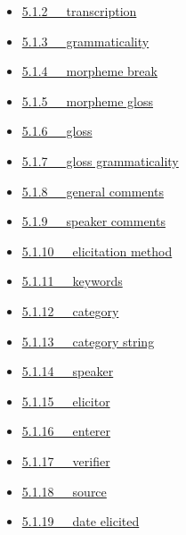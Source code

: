 \documentclass[letterpaper,10pt,english]{sphinxmanual}
\begin{document}
{\begin{minipage}{0.95\linewidth}
\begin{itemize}
\begin{itemize}
\begin{itemize}
\item {} 
{\hyperref[documentation:transcription]{5.1.2   transcription}}

\item {} 
{\hyperref[documentation:grammaticality]{5.1.3   grammaticality}}

\item {} 
{\hyperref[documentation:morpheme-break]{5.1.4   morpheme break}}

\item {} 
{\hyperref[documentation:morpheme-gloss]{5.1.5   morpheme gloss}}

\item {} 
{\hyperref[documentation:gloss]{5.1.6   gloss}}

\item {} 
{\hyperref[documentation:gloss-grammaticality]{5.1.7   gloss grammaticality}}

\item {} 
{\hyperref[documentation:general-comments]{5.1.8   general comments}}

\item {} 
{\hyperref[documentation:speaker-comments]{5.1.9   speaker comments}}

\item {} 
{\hyperref[documentation:elicitation-method]{5.1.10   elicitation method}}

\item {} 
{\hyperref[documentation:keywords]{5.1.11   keywords}}

\item {} 
{\hyperref[documentation:category]{5.1.12   category}}

\item {} 
{\hyperref[documentation:category-string]{5.1.13   category string}}

\item {} 
{\hyperref[documentation:speaker]{5.1.14   speaker}}

\item {} 
{\hyperref[documentation:elicitor]{5.1.15   elicitor}}

\item {} 
{\hyperref[documentation:enterer]{5.1.16   enterer}}

\item {} 
{\hyperref[documentation:verifier]{5.1.17   verifier}}

\item {} 
{\hyperref[documentation:source]{5.1.18   source}}

\item {} 
{\hyperref[documentation:date-elicited]{5.1.19   date elicited}}


\end{itemize}
\end{itemize}
\end{itemize}
\end{minipage}}
\end{document}
